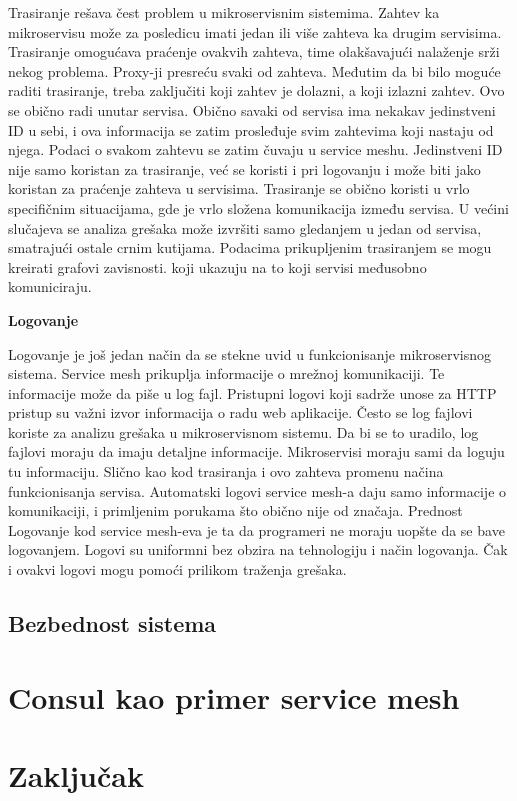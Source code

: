 \documentclass[a4paper,12pt]{report}
\begin{document}
Trasiranje rešava čest problem u mikroservisnim sistemima. Zahtev ka mikroservisu može za posledicu imati jedan ili više zahteva ka drugim servisima. Trasiranje omogućava praćenje ovakvih zahteva, time olakšavajući nalaženje srži nekog problema. Proxy-ji presreću svaki od zahteva. Međutim da bi bilo moguće raditi trasiranje, treba zaključiti koji zahtev je dolazni, a koji izlazni zahtev. Ovo se obično radi unutar servisa. Obično savaki od servisa ima nekakav jedinstveni ID u sebi, i ova informacija se zatim prosleđuje svim zahtevima koji nastaju od njega. Podaci o svakom zahtevu se  zatim čuvaju u service meshu. Jedinstveni ID nije samo koristan za trasiranje, već se koristi i pri logovanju i može biti jako koristan za praćenje zahteva u servisima. Trasiranje se obično koristi u vrlo specifičnim situacijama, gde je vrlo složena komunikacija između servisa. U većini slučajeva se analiza grešaka može izvršiti samo gledanjem u jedan od servisa, smatrajući ostale crnim kutijama. Podacima prikupljenim trasiranjem se mogu kreirati grafovi zavisnosti. koji ukazuju na to koji servisi međusobno komuniciraju. \newline

\textbf{Logovanje}\newline

Logovanje je još jedan način da se stekne uvid u funkcionisanje mikroservisnog sistema. Service mesh prikuplja informacije o mrežnoj komunikaciji. Te informacije može da piše u log fajl. Pristupni logovi koji sadrže unose za HTTP pristup su važni izvor informacija o radu web aplikacije. Često se log fajlovi koriste za analizu grešaka u mikroservisnom sistemu. Da bi se to uradilo, log fajlovi moraju da imaju detaljne informacije. Mikroservisi moraju sami da loguju tu informaciju. Slično kao kod trasiranja i ovo zahteva promenu načina funkcionisanja servisa. Automatski logovi service mesh-a daju samo informacije o komunikaciji, i primljenim porukama što obično nije od značaja. Prednost Logovanje kod service mesh-eva je ta da programeri ne moraju uopšte da se bave logovanjem. Logovi su uniformni bez obzira na tehnologiju i način logovanja. Čak i ovakvi logovi mogu pomoći prilikom traženja grešaka. \newline
 
\section{Bezbednost sistema}

\chapter{Consul kao primer service mesh}

\chapter{Zaključak}
\end{document}
